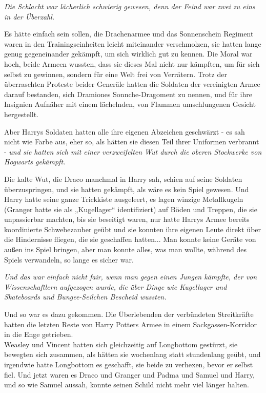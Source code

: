 {\emph{Die Schlacht war lächerlich schwierig gewesen, denn der Feind war zwei zu eins in der Überzahl.}

Es hätte einfach sein sollen, die Drachenarmee und das Sonnenschein Regiment waren in den Trainingseinheiten leicht miteinander verschmolzen, sie hatten lange genug gegeneinander gekämpft, um sich wirklich gut zu kennen. Die Moral war hoch, beide Armeen wussten, dass sie dieses Mal nicht nur kämpften, um für sich selbst zu gewinnen, sondern für eine Welt frei von Verrätern. Trotz der überraschten Proteste beider Generäle hatten die Soldaten der vereinigten Armee darauf bestanden, sich Dramiones Sonnche-Dragoment zu nennen, und für ihre Insignien Aufnäher mit einem lächelnden, von Flammen umschlungenen Gesicht hergestellt.

Aber Harrys Soldaten hatten alle ihre eigenen Abzeichen geschwärzt - es sah nicht wie Farbe aus, eher so, als hätten sie diesen Teil ihrer Uniformen verbrannt - \emph{und sie hatten sich mit einer verzweifelten Wut durch die oberen Stockwerke von Hogwarts gekämpft.}

Die kalte Wut, die Draco manchmal in Harry sah, schien auf seine Soldaten überzuspringen, und sie hatten gekämpft, als wäre es kein Spiel gewesen. Und Harry hatte seine ganze Trickkiste ausgeleert, es lagen winzige Metallkugeln (Granger hatte sie als „Kugellager“ identifiziert) auf Böden und Treppen, die sie unpassierbar machten, bis sie beseitigt waren, nur hatte Harrys Armee bereits koordinierte Schwebezauber geübt und sie konnten ihre eigenen Leute direkt über die Hindernisse fliegen, die sie geschaffen hatten... Man konnte keine Geräte von außen ins Spiel bringen, aber man konnte alles, was man wollte, während des Spiels verwandeln, so lange es sicher war.

\emph{Und das war einfach nicht fair, wenn man gegen einen Jungen kämpfte, der von Wissenschaftlern aufgezogen wurde, die über Dinge wie Kugellager und Skateboards und Bungee-Seilchen Bescheid wussten.}

Und so war es dazu gekommen. Die Überlebenden der verbündeten Streitkräfte hatten die letzten Reste von Harry Potters Armee in einem Sackgassen-Korridor in die Enge getrieben.\\ Weasley und Vincent hatten sich gleichzeitig auf Longbottom gestürzt, sie bewegten sich zusammen, als hätten sie wochenlang statt stundenlang geübt, und irgendwie hatte Longbottom es geschafft, sie beide zu verhexen, bevor er selbst fiel. Und jetzt waren es Draco und Granger und Padma und Samuel und Harry, und so wie Samuel aussah, konnte seinen Schild nicht mehr viel länger halten.

}
